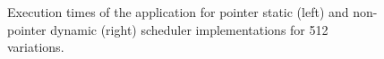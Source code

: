 \begin{figure}[!htp]
	\begin{center}
		\caption{Execution times of the \tth application for pointer static (left) and non-pointer dynamic (right) scheduler implementations for 512 variations.}
		\label{fig:ExecTimes}
	\end{center}
\end{figure}

